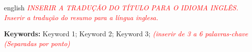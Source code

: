 \begin{resumo}[\abstracttitlename]
  \begin{otherlanguage*}{english}
    \textit{\textcolor{red}{INSERIR A TRADUÇÃO DO TÍTULO PARA O IDIOMA INGLÊS. \\
Inserir a tradução do resumo para a língua inglesa.}}
    
   \vspace{\onelineskip}
 
   \noindent 
   \textbf{Keywords:} Keyword 1; Keyword 2; Keyword 3; \textit{\textcolor{red}{(inserir de 3 a 6 palavras-chave (Separadas por ponto)}}
 \end{otherlanguage*}
\end{resumo}

